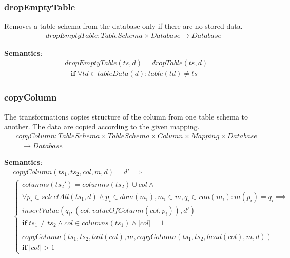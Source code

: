 \documentclass[10pt]{article}
\begin{document}
\subsubsection{dropEmptyTable}
Removes a table schema from the database only if there are no stored data.
\begin{align}
dropEmptyTable:  TableSchema \times Database \rightarrow Database
\end{align}

\noindent \textbf{Semantics}:
\begin{align}
& dropEmptyTable(ts, d) = dropTable(ts, d) \nonumber \\
& \;\;\; \mathbf{if} \; \forall td \in tableData(d) : table(td) \neq ts
\end{align}


\subsubsection{copyColumn}
The transformations copies structure of the column from one table schema to another. The data are copied according to the given mapping.
\begin{align}
& copyColumn: TableSchema \times TableSchema \times Column \times Mapping \times Database   \nonumber \\
& \;\;\; \rightarrow Database
\end{align}

\noindent \textbf{Semantics}:
\begin{align}
& copyColumn(ts_1, ts_2, col, m, d) = d' \implies \\ 
& \begin{cases}
 columns(ts_2') = columns(ts_2) \cup col \land \nonumber \\
     \forall p_i \in selectAll(ts_1, d) \land p_i \in dom(m_i), m_i \in m, q_{i} \in ran(m_i) : m(p_i) = q_i \implies \nonumber \\
  insertValue(q_i, (col, valueOfColumn(col, p_i)), d')  \nonumber \\
 \mathbf{if} \; ts_1 \neq ts_2 \land col \in columns(ts_1) \land |col| = 1
 \\\\
 copyColumn(ts_1, ts_2, tail(col), m, copyColumn(ts_1, ts_2, head(col), m, d))\\
 \mathbf{if} \; |col| > 1
 \end{cases}
\end{align}
\end{document}
